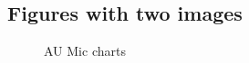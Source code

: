\newpage

\subsection{Figures with two images}

\begin{figure}[ht!]
    \centering
    \begin{subfigure}
        \centering
    \end{subfigure}
    \hfill
    \begin{subfigure}
        \centering
    \end{subfigure}
    \caption{AU Mic charts}
    \label{charts-au-mic}
\end{figure}

